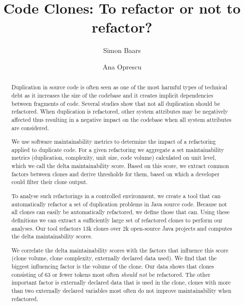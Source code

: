 \documentclass[sigconf,review,anonymous]{acmart}
\begin{document}
\title{Code Clones: To refactor or not to refactor?}

\author{Simon Baars}

\author{Ana Oprescu}

\begin{abstract}
Duplication in source code is often seen as one of the most harmful types of technical debt as it increases the size of the codebase and it creates implicit dependencies between fragments of code. Several studies show that not all duplication should be refactored. When duplication is refactored, other system attributes may be negatively affected thus resulting in a negative impact on the codebase when all system attributes are considered.

We use software maintainability metrics to determine the impact of a refactoring applied to duplicate code. For a given refactoring we aggregate a set maintainability metrics (duplication, complexity, unit size, code volume) calculated on unit level, which we call the delta maintainability score. Based on this score, we extract common factors between clones and derive thresholds for them, based on which a developer could filter their clone output.

To analyse such refactorings in a controlled environment, we create a tool that can automatically refactor a set of duplication problems in Java source code. Because not all clones can easily be automatically refactored, we define those that can. Using these definitions we can extract a sufficiently large set of refactored clones to perform our analyses. Our tool refactors 13k clones over 2k open-source Java projects and computes the delta maintainability scores.

We correlate the delta maintainability scores with the factors that influence this score (clone volume, clone complexity, externally declared data used). We find that the biggest influencing factor is the volume of the clone. Our data shows that clones consisting of 63 or fewer tokens most often \textit{should not} be refactored. The other important factor is externally declared data that is used in the clone, clones with more than two externally declared variables most often do not improve maintainability when refactored.

\end{abstract}
\end{document}
